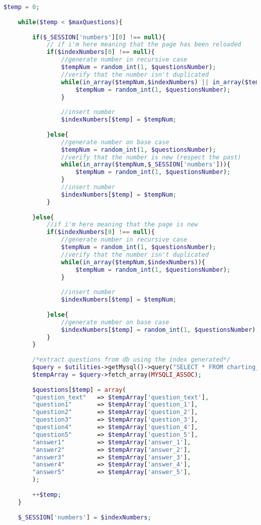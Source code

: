 \begin{lstlisting}[language=php]
	$temp = 0;
	
	while($temp < $maxQuestions){
		
		if($_SESSION['numbers'][0] !== null){
			// if i'm here meaning that the page has been reloaded     
			if($indexNumbers[0] !== null){
				//generate number in recursive case
				$tempNum = random_int(1, $questionsNumber);
				//verify that the number isn't duplicated
				while(in_array($tempNum,$indexNumbers) || in_array($tempNum,$_SESSION['numbers'])){
					$tempNum = random_int(1, $questionsNumber);
				}
				
				//insert number
				$indexNumbers[$temp] = $tempNum; 
				
			}else{
				//generate number on base case
				$tempNum = random_int(1, $questionsNumber);
				//verify that the number is new (respect the past)
				while(in_array($tempNum,$_SESSION['numbers'])){
					$tempNum = random_int(1, $questionsNumber);
				}
				//insert number
				$indexNumbers[$temp] = $tempNum; 
			}
			
		}else{
			//if i'm here meaning that the page is new
			if($indexNumbers[0] !== null){
				//generate number in recursive case
				$tempNum = random_int(1, $questionsNumber);
				//verify that the number isn't duplicated
				while(in_array($tempNum,$indexNumbers)){
					$tempNum = random_int(1, $questionsNumber);
				}
				
				//insert number
				$indexNumbers[$temp] = $tempNum;
				
			}else{
				//generate number on base case
				$indexNumbers[$temp] = random_int(1, $questionsNumber);
			}
		}
		
		/*extract questions from db using the index generated*/
		$query = $utilities->getMysql()->query("SELECT * FROM charting_elements WHERE (id = '{$indexNumbers[$temp]}')");
		$tempArray = $query->fetch_array(MYSQLI_ASSOC);
		
		$questions[$temp] = array(
		"question_text"   => $tempArray['question_text'],
		"question1"       => $tempArray['question_1'],
		"question2"       => $tempArray['question_2'],
		"question3"       => $tempArray['question_3'],
		"question4"       => $tempArray['question_4'],
		"question5"       => $tempArray['question_5'],
		"answer1"         => $tempArray['answer_1'],
		"answer2"         => $tempArray['answer_2'],
		"answer3"         => $tempArray['answer_3'],
		"answer4"         => $tempArray['answer_4'],
		"answer5"         => $tempArray['answer_5'],
		);
		
		++$temp;
	}
	
	$_SESSION['numbers'] = $indexNumbers;
\end{lstlisting}

